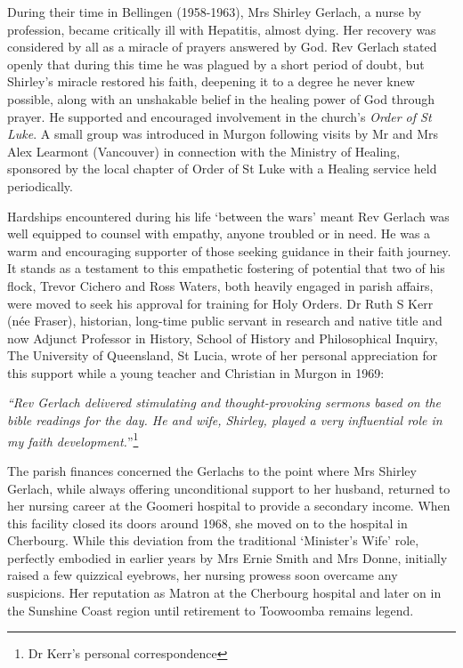 During their time in Bellingen (1958-1963), Mrs Shirley Gerlach, a nurse by profession, became critically ill with Hepatitis, almost dying. Her recovery was considered by all as a miracle of prayers answered by God. Rev Gerlach stated openly that during this time he was plagued by a short period of doubt, but Shirley's miracle restored his faith, deepening it to a degree he never knew possible, along with an unshakable belief in the healing power of God through prayer. He supported and encouraged involvement in the church's \emph{Order of St Luke}. A small group was introduced in Murgon following visits by Mr and Mrs Alex Learmont (Vancouver) in connection with the Ministry of Healing, sponsored by the local chapter of Order of St Luke with a Healing service held periodically.



Hardships encountered during his life `between the wars' meant Rev Gerlach was well equipped to counsel with empathy, anyone troubled or in need. He was a warm and encouraging supporter of those seeking guidance in their faith journey. It stands as a testament to this empathetic fostering of potential that two of his flock, Trevor Cichero and Ross Waters, both heavily engaged in parish affairs, were moved to seek his approval for training for Holy Orders. Dr Ruth S Kerr (née Fraser), historian, long-time public servant in research and native title and now Adjunct Professor in History, School of History and Philosophical Inquiry, The University of Queensland, St Lucia, wrote of her personal appreciation for this support while a young teacher and Christian in Murgon in 1969:



\emph{``Rev Gerlach delivered stimulating and thought-provoking sermons based on the bible readings for the day. He and wife, Shirley, played a very influential role in my faith development.}''\footnote{Dr Kerr's personal correspondence}


The parish finances concerned the Gerlachs to the point where Mrs Shirley Gerlach, while always offering unconditional support to her husband, returned to her nursing career at the Goomeri hospital to provide a secondary income. When this facility closed its doors around 1968, she moved on to the hospital in Cherbourg. While this deviation from the traditional `Minister's Wife' role, perfectly embodied in earlier years by Mrs Ernie Smith and Mrs Donne, initially raised a few quizzical eyebrows, her nursing prowess soon overcame any suspicions. Her reputation as Matron at the Cherbourg hospital and later on in the Sunshine Coast region until retirement to Toowoomba remains legend.



